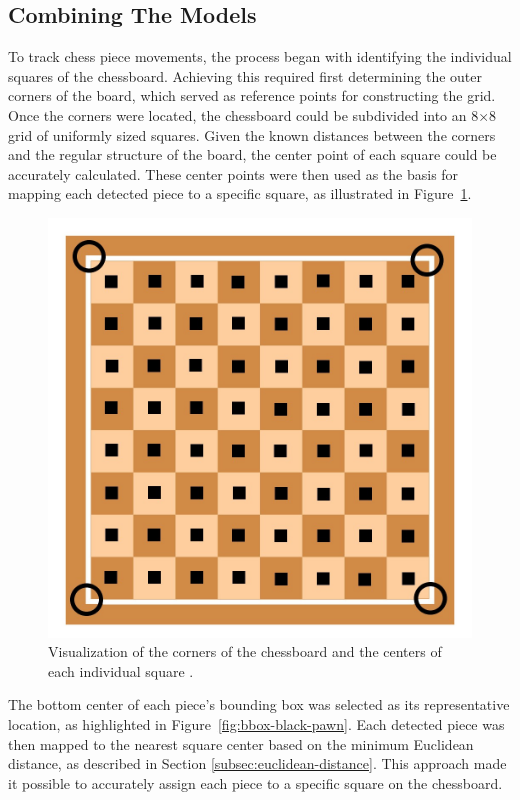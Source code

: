\subsection{Combining The Models}

To track chess piece movements, the process began with identifying the individual squares of the chessboard. Achieving this required first determining the outer corners of the board, which served as reference points for constructing the grid. Once the corners were located, the chessboard could be subdivided into an 8×8 grid of uniformly sized squares. Given the known distances between the corners and the regular structure of the board, the center point of each square could be accurately calculated. These center points were then used as the basis for mapping each detected piece to a specific square, as illustrated in Figure~\ref{fig:chessboard-centers}.

\newpage



\begin{figure}[h!]
    \centering
    \includegraphics[width=0.75\linewidth]{figures/methods/ml-models/outer_corners_centers_chessboard.jpg}
    \caption[Chessboard corners and centers]{Visualization of the corners of the chessboard and the centers of each individual square \cite{vectorstock:chessboard-svg}.}
    \label{fig:chessboard-centers}
\end{figure}


The bottom center of each piece’s bounding box was selected as its representative location, as highlighted in Figure~\ref{fig:bbox-black-pawn}. Each detected piece was then mapped to the nearest square center based on the minimum Euclidean distance, as described in Section \ref{subsec:euclidean-distance}. This approach made it possible to accurately assign each piece to a specific square on the chessboard.


